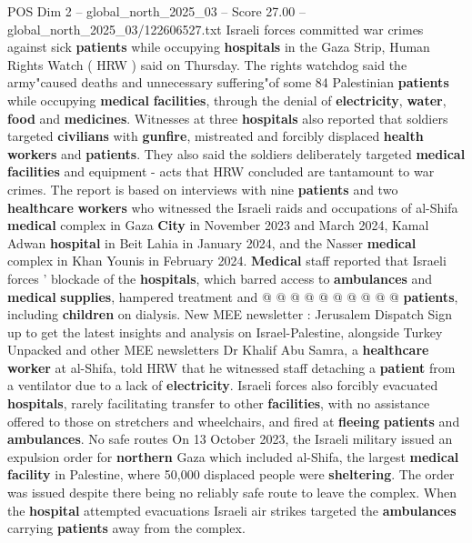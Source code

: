 \begin{textsample}{POS Dim 2 – global\_north\_2025\_03 – Score 27.00 – global\_north\_2025\_03/122606527.txt}  \label{ex:f2_pos_405}
Israeli forces committed war crimes against sick \textbf{patients} while occupying \textbf{hospitals} in the Gaza Strip, Human Rights Watch ( HRW ) said on Thursday.
The rights watchdog said the army"caused deaths and unnecessary suffering"of some 84 Palestinian \textbf{patients} while occupying \textbf{medical} \textbf{facilities}, through the denial of \textbf{electricity}, \textbf{water}, \textbf{food} and \textbf{medicines}.
Witnesses at three \textbf{hospitals} also reported that soldiers targeted \textbf{civilians} with \textbf{gunfire}, mistreated and forcibly displaced \textbf{health} \textbf{workers} and \textbf{patients}.
They also said the soldiers deliberately targeted \textbf{medical} \textbf{facilities} and equipment - acts that HRW concluded are tantamount to war crimes.
The report is based on interviews with nine \textbf{patients} and two \textbf{healthcare} \textbf{workers} who witnessed the Israeli raids and occupations of al-Shifa \textbf{medical} complex in Gaza \textbf{City} in November 2023 and March 2024, Kamal Adwan \textbf{hospital} in Beit Lahia in January 2024, and the Nasser \textbf{medical} complex in Khan Younis in February 2024. \textbf{Medical} staff reported that Israeli forces ' blockade of the \textbf{hospitals}, which barred access to \textbf{ambulances} and \textbf{medical} \textbf{supplies}, hampered treatment and @ @ @ @ @ @ @ @ @ @ \textbf{patients}, including \textbf{children} on dialysis.
New MEE newsletter : Jerusalem Dispatch Sign up to get the latest insights and analysis on Israel-Palestine, alongside Turkey Unpacked and other MEE newsletters Dr Khalif Abu Samra, a \textbf{healthcare} \textbf{worker} at al-Shifa, told HRW that he witnessed staff detaching a \textbf{patient} from a ventilator due to a lack of \textbf{electricity}.
Israeli forces also forcibly evacuated \textbf{hospitals}, rarely facilitating transfer to other \textbf{facilities}, with no assistance offered to those on stretchers and wheelchairs, and fired at \textbf{fleeing} \textbf{patients} and \textbf{ambulances}.
No safe routes On 13 October 2023, the Israeli military issued an expulsion order for \textbf{northern} Gaza which included al-Shifa, the largest \textbf{medical} \textbf{facility} in Palestine, where 50,000 displaced people were \textbf{sheltering}.
The order was issued despite there being no reliably safe route to leave the complex.
When the \textbf{hospital} attempted evacuations Israeli air strikes targeted the \textbf{ambulances} carrying \textbf{patients} away from the complex.

\end{textsample}
